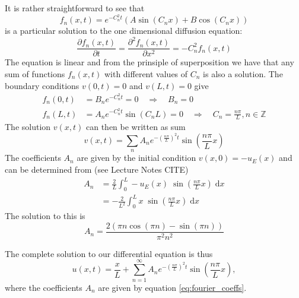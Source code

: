 \documentclass[reprint, english,notitlepage,nofootinbib]{revtex4-1}  %
\begin{document}
It is rather straightforward to see that
\begin{equation}
\label{eq:analytic_part_sol_1D_diffusion_general}
f_n(x, t) = e^{- C_n^2 t} \left( A \sin(C_n x) + B \cos(C_n x) \right)
\end{equation}
is a particular solution to the one dimensional diffusion equation:
\begin{equation*}
\frac{\partial f_n(x, t)}{\partial t} = \frac{\partial^2 f_n(x, t)}{\partial x^2} = -C_n^2 f_n(x, t)
\end{equation*}
The equation is linear and from the prinsiple of superposition we have that any sum of functions $f_n(x, t)$ with different values of $C_n$ is also a solution. The boundary conditions $v(0, t) = 0$ and $v(L, t) = 0$ give
\begin{align*}
f_n(0, t) &= B_n e^{- C_n^2 t} = 0 \quad \Rightarrow \quad B_n = 0 \\
f_n(L, t) &= A_n e^{- C_n^2 t} \sin(C_n L) = 0 \quad \Rightarrow \quad C_n = \frac{n \pi}{L}, n \in \mathbb{Z}
\end{align*}
The solution $v(x, t)$ can then be written as sum
\begin{equation*}
v(x, t) = \sum_n A_n e^{- \left( \frac{n \pi}{L} \right)^2 t} \sin( \frac{n \pi}{L} x)
\end{equation*}
The coefficients $A_n$ are given by the initial condition $v(x, 0) = - u_E(x)$ and can be determined from (see Lecture Notes CITE)
\begin{align*}
A_n &= \frac{2}{L} \int_0^L - u_E(x) \; \sin( \frac{n \pi}{L} x) \; \mathrm dx \\
&= - \frac{2}{L^2} \int_0^L x \; \sin( \frac{n \pi}{L} x) \; \mathrm dx
\end{align*}
The solution to this is
\begin{equation}
\label{eq:fourier_coeffs}
A_n = \dfrac{2 \left( \pi n \cos(\pi n) - \sin(\pi n) \right)}{\pi^2 n^2}
\end{equation}

The complete solution to our differential equation is thus
\begin{equation}
\label{eq:exact_solution_1D}
u(x, t) = \frac{x}{L} + \sum_{n=1}^\infty A_n e^{- \left( \frac{n \pi}{L} \right)^2 t} \sin( \frac{n \pi}{L} x),
\end{equation}
where the coefficients $A_n$ are given by equation \eqref{eq:fourier_coeffs}.
\end{document}
